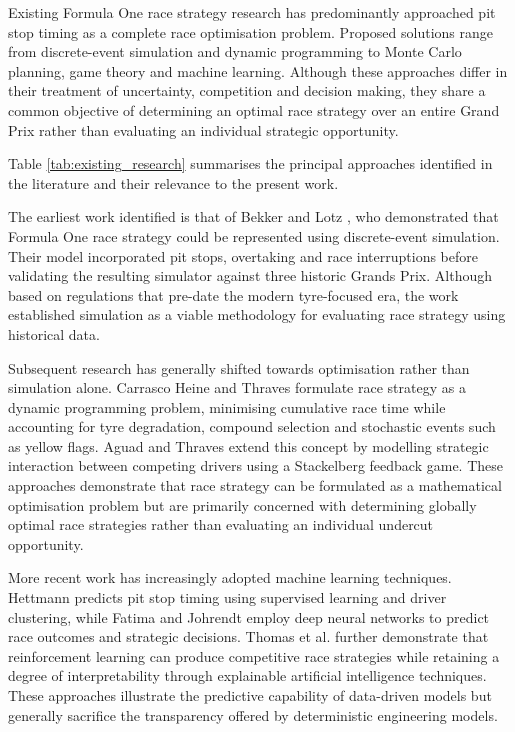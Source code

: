 Existing Formula One race strategy research has predominantly approached pit stop timing as a complete race optimisation problem. Proposed solutions range from discrete-event simulation and dynamic programming to
Monte Carlo planning, game theory and machine learning. Although these approaches differ in their treatment of uncertainty, competition and decision making, they share a common objective of determining an optimal
race strategy over an entire Grand Prix rather than evaluating an individual strategic opportunity.

Table \ref{tab:existing_research} summarises the principal approaches identified in the literature and their relevance to the present work.



The earliest work identified is that of Bekker and Lotz \cite{BekkerLotz2009}, who demonstrated that Formula One race strategy could be represented using discrete-event simulation. Their model incorporated pit stops, overtaking and race interruptions before validating the resulting simulator against three historic Grands Prix. Although based on regulations that pre-date the modern tyre-focused era, the work established simulation as a viable methodology for evaluating race strategy using historical data.

Subsequent research has generally shifted towards optimisation rather than simulation alone. Carrasco Heine and Thraves \cite{CarrascoHeineThraves2023} formulate race strategy as a dynamic programming problem, minimising cumulative race time while accounting for tyre degradation, compound selection and stochastic events such as yellow flags. Aguad and Thraves \cite{AguadThraves2024} extend this concept by modelling strategic interaction between competing drivers using a Stackelberg feedback game. These approaches demonstrate that race strategy can be formulated as a mathematical optimisation problem but are primarily concerned with determining globally optimal race strategies rather than evaluating an individual undercut opportunity.

More recent work has increasingly adopted machine learning techniques. Hettmann \cite{Hettmann2024} predicts pit stop timing using supervised learning and driver clustering, while Fatima and Johrendt \cite{FatimaJohrendt2023} employ deep neural networks to predict race outcomes and strategic decisions. Thomas et al. \cite{ThomasEtAl2025} further demonstrate that reinforcement learning can produce competitive race strategies while retaining a degree of interpretability through explainable artificial intelligence techniques. These approaches illustrate the predictive capability of data-driven models but generally sacrifice the transparency offered by deterministic engineering models.


